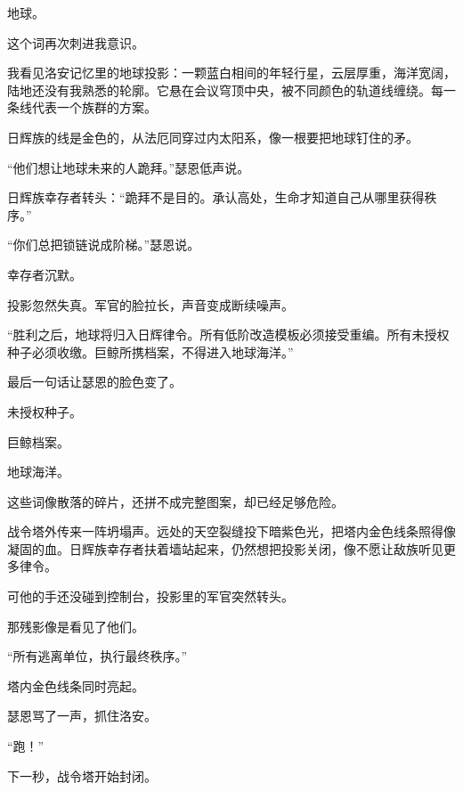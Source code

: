 地球。

这个词再次刺进我意识。

我看见洛安记忆里的地球投影：一颗蓝白相间的年轻行星，云层厚重，海洋宽阔，陆地还没有我熟悉的轮廓。它悬在会议穹顶中央，被不同颜色的轨道线缠绕。每一条线代表一个族群的方案。

日辉族的线是金色的，从法厄同穿过内太阳系，像一根要把地球钉住的矛。

“他们想让地球未来的人跪拜。”瑟恩低声说。

日辉族幸存者转头：“跪拜不是目的。承认高处，生命才知道自己从哪里获得秩序。”

“你们总把锁链说成阶梯。”瑟恩说。

幸存者沉默。

投影忽然失真。军官的脸拉长，声音变成断续噪声。

“胜利之后，地球将归入日辉律令。所有低阶改造模板必须接受重编。所有未授权种子必须收缴。巨鲸所携档案，不得进入地球海洋。”

最后一句话让瑟恩的脸色变了。

未授权种子。

巨鲸档案。

地球海洋。

这些词像散落的碎片，还拼不成完整图案，却已经足够危险。

战令塔外传来一阵坍塌声。远处的天空裂缝投下暗紫色光，把塔内金色线条照得像凝固的血。日辉族幸存者扶着墙站起来，仍然想把投影关闭，像不愿让敌族听见更多律令。

可他的手还没碰到控制台，投影里的军官突然转头。

那残影像是看见了他们。

“所有逃离单位，执行最终秩序。”

塔内金色线条同时亮起。

瑟恩骂了一声，抓住洛安。

“跑！”

下一秒，战令塔开始封闭。
